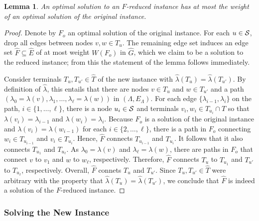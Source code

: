 \documentclass[letterpaper,11pt]{article}
\newtheorem{lemma}[theorem]{Lemma}
\newcommand{\Comp}{\lambda}
\begin{document}
\begin{lemma}\label{lemma:stage2_cost}
An optimal solution to an $F$-reduced instance has at most the weight of an
optimal solution of the original instance.
\end{lemma}
\begin{proof}
Denote by $F_o$ an optimal solution of the original instance. For each $u\in
{\cal S}$, drop all edges between nodes $v,w\in T_u$. The remaining edge set
induces an edge set $\hat{F}\subseteq \hat{E}$ of at most weight $W(F_o)$ in
$\hat{G}$, which we claim to be a solution to the reduced instance; from this
the statement of the lemma follows immediately.

Consider terminals $T_u,T_{u'}\in \hat{T}$ of the new instance with
$\hat{\Comp}(T_u)=\hat{\Comp}(T_{u'})$. By definition of $\hat{\Comp}$, this
entails that there are nodes $v\in T_u$ and $w\in T_{u'}$ and a path
$(\Comp_0=\Comp(v),\Comp_1,\ldots,\Comp_{\ell}=\Comp(w))$ in
$(\Lambda,E_{\Lambda})$. For each edge $\{\Comp_{i-1},\Comp_i\}$ on the path,
$i\in \{1,\ldots,\ell\}$, there is a node $u_i\in {\cal S}$ and terminals
$v_i,w_i\in T_{u_i}\cap T$ so that $\Comp(v_i)=\Comp_{i-1}$ and
$\Comp(w_i)=\Comp_i$. Because $F_o$ is a solution of the original instance and
$\Comp(v_i)=\Comp(w_{i-1})$ for each $i\in \{2,\ldots,\ell\}$, there is a path
in $F_o$ connecting $w_i\in T_{u_{i-1}}$ and $v_i\in T_{u_i}$. Hence, $\hat{F}$
connects $T_{u_{i-1}}$ and $T_{u_i}$. It follows that it also connects $T_{u_1}$
and $T_{u_{\ell}}$. As $\Comp_0=\Comp(v)$ and $\Comp_{\ell}=\Comp(w)$, there are
paths in $F_o$ that connect $v$ to $v_1$ and $w$ to $w_{\ell}$, respectively.
Therefore, $\hat{F}$ connects $T_u$ to $T_{u_1}$ and $T_{u'}$ to $T_{u_{\ell}}$,
respectively. Overall, $\hat{F}$ connets $T_u$ and $T_{u'}$. Since
$T_u,T_{u'}\in \hat{T}$ were arbitrary with the property that
$\hat{\Comp}(T_u)=\hat{\Comp}(T_{u'})$, we conclude that $\hat{F}$ is indeed
a solution of the $F$-reduced instance.
\end{proof}

\subsubsection*{Solving the New Instance}
\end{document}

